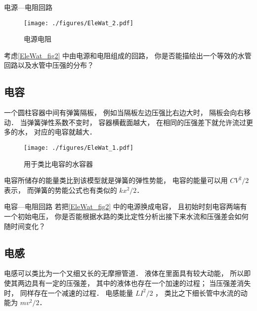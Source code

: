 \begin{exercise}{电源—电阻回路}
\begin{figure}[ht]
\centering
\texttt{[image: ./figures/EleWat\_2.pdf]}
\caption{电源电阻} \label{EleWat_fig2}
\end{figure}
考虑\autoref{EleWat_fig2} 中由电源和电阻组成的回路， 你是否能描绘出一个等效的水管回路以及水管中压强的分布？
\end{exercise}

\subsection{电容}
一个圆柱容器中间有弹簧隔板， 例如当隔板左边压强比右边大时， 隔板会向右移动． 当弹簧弹性系数不变时， 容器横截面越大， 在相同的压强差下就允许流过更多的水， 对应的电容就越大．
\begin{figure}[ht]
\centering
\texttt{[image: ./figures/EleWat\_1.pdf]}
\caption{用于类比电容的水容器} \label{EleWat_fig1}
\end{figure}

电容所储存的能量类比到该模型就是弹簧的弹性势能， 电容的能量可以用 $CV^2/2$ 表示， 而弹簧的势能公式也有类似的 $kx^2/2$．

\begin{exercise}{电容—电阻回路}
若把\autoref{EleWat_fig2} 中的电源换成电容， 且初始时刻电容两端有一个初始电压， 你是否能根据水路的类比定性分析出接下来水流和压强差会如何随时间变化？
\end{exercise}

\subsection{电感}
电感可以类比为一个又细又长的无摩擦管道． 液体在里面具有较大动能， 所以即使其两边具有一定的压强差， 其中的液体也存在一个加速的过程； 当压强差消失时， 同样存在一个减速的过程． 电感能量 $LI^2/2$ ， 类比之下细长管中水流的动能为 $mv^2/2$．
